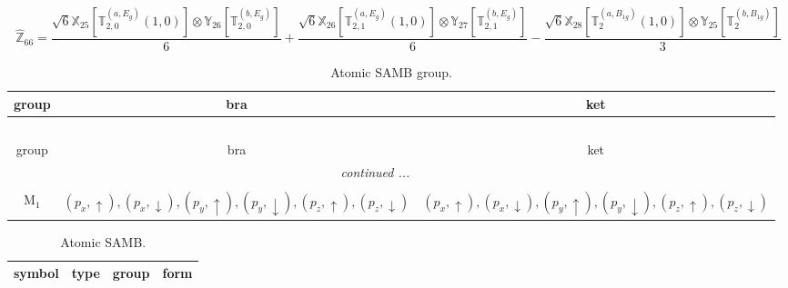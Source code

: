 \documentclass[fleqn,10pt,landscape]{article}
\begin{document}
\begin{itemize}
\begin{dmath*}
\hat{\mathbb{Z}}_{66}=\frac{\sqrt{6} \mathbb{X}_{25}[\mathbb{T}_{2,0}^{(a,E_{g})}(1,0)] \otimes\mathbb{Y}_{26}[\mathbb{T}_{2,0}^{(b,E_{g})}]}{6} + \frac{\sqrt{6} \mathbb{X}_{26}[\mathbb{T}_{2,1}^{(a,E_{g})}(1,0)] \otimes\mathbb{Y}_{27}[\mathbb{T}_{2,1}^{(b,E_{g})}]}{6} - \frac{\sqrt{6} \mathbb{X}_{28}[\mathbb{T}_{2}^{(a,B_{1g})}(1,0)] \otimes\mathbb{Y}_{25}[\mathbb{T}_{2}^{(b,B_{1g})}]}{3}
\end{dmath*}
\begin{center}
\renewcommand{\arraystretch}{1.3}
\begin{longtable}{c|c|c}
\caption{Atomic SAMB group.}
 \\
 \hline \hline
group & bra & ket \\ \hline \endfirsthead

\multicolumn{2}{l}{\tablename\ \thetable{}} \\
 \hline \hline
group & bra & ket \\ \hline \endhead

 \hline \hline
\multicolumn{2}{r}{\footnotesize\it continued ...} \\ \endfoot

 \hline \hline
\multicolumn{2}{r}{} \\ \endlastfoot

M$_{1}$ & $(p_{x},\uparrow), (p_{x},\downarrow), (p_{y},\uparrow), (p_{y},\downarrow), (p_{z},\uparrow), (p_{z},\downarrow)$ & $(p_{x},\uparrow), (p_{x},\downarrow), (p_{y},\uparrow), (p_{y},\downarrow), (p_{z},\uparrow), (p_{z},\downarrow)$ \\
\end{longtable}
\end{center}
\begin{center}
\renewcommand{\arraystretch}{1.3}
\begin{longtable}{c|c|c|c}
\caption{Atomic SAMB.}
 \\
 \hline \hline
symbol & type & group & form \\ \hline \endfirsthead


\end{longtable}
\end{center}
\end{itemize}
\end{document}
